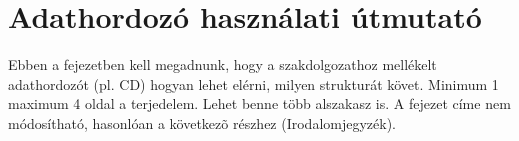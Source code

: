 \chapter*{Adathordozó használati útmutató}

Ebben a fejezetben kell megadnunk, hogy a szakdolgozathoz mellékelt adathordozót (pl. CD) hogyan lehet elérni, milyen strukturát követ. Minimum 1 maximum 4 oldal a terjedelem. Lehet benne több alszakasz is. A fejezet címe nem módosítható, hasonlóan a következõ részhez (Irodalomjegyzék).
